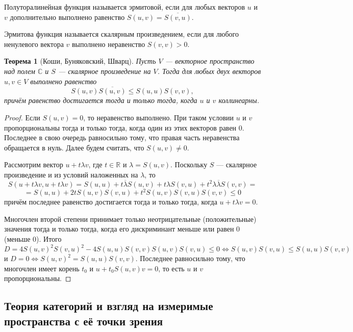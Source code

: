 \documentclass[12pt]{article}
\newtheorem{theorem}{Теорема}
\numberwithin{theorem}{section}
\numberwithin{proposition}{section}
\theoremstyle{definition}
\newcommand{\CC}{\mathbb{C}}
\newcommand{\RR}{\mathbb{R}}
\newcommand{\defin}[2]{\hypertarget{#2}{{\color{red} #1}}}
\begin{document}
	Полуторалинейная функция называется \defin{эрмитовой}{hermitian}, если для любых векторов $ u $ и $ v $ дополнительно выполнено равенство
	$ S(u, v) = \overline{S(v, u)} $.
	
	Эрмитова функция называется \defin{скалярным произведением}{C-inner-product}, если для любого ненулевого вектора $ v $
	выполнено неравенство $ S(v, v) > 0 $.
	
	
	\begin{theorem}[Коши, Буняковский, Шварц] \label{Cauchy-complex}
		Пусть $ V $ --- векторное пространство над полем $ \CC $ и $ S $ --- скалярное произведение на $ V $.
		Тогда для любых двух векторов $ u, v \in V $ выполнено равенство
		$$ S(u, v)\overline{S(u,v)} \leqslant S(u,u)S(v,v), $$
		причём равенство достигается тогда и только тогда, когда $ u $ и $ v $ коллинеарны.
	\end{theorem}
	
	\begin{proof}
		Если $ S(u, v) = 0 $, то неравенство выполнено. При таком условии $ u $ и $ v $ пропорциональны тогда и только тогда,
		когда один из этих векторов равен 0. Последнее в свою очередь равносильно тому, что правая часть неравенства обращается в нуль. Далее будем считать, что $ S(u,v) \neq 0 $.
		
		Рассмотрим вектор $ u + t\lambda v $, где $ t \in \RR $ и $ \lambda = S(u,v) $.
		Поскольку $ S $ --- скалярное произведение и из условий наложенных на $ 
		\lambda $, то 
		$$ S(u + t\lambda v, u + t\lambda v) 
		= S(u, u) + t\overline{\lambda}S(u, v) + t\lambda S(v, u) + t^2\lambda\overline{\lambda}S(v,v) = $$ 
		$$ = S(u,u) + 2tS(u,v)S(v,u) + t^2S(u,v)S(v,u)S(v,v) \leqslant 0 $$
		причём последнее равенство достигается тогда и только тогда, когда $ u + t\lambda v = 0 $.
		
		Многочлен второй степени принимает только неотрицательные (положительные) значения тогда и только тогда, когда его дискриминант меньше или равен 0 (меньше 0).
		Итого $$ D = 4S(u,v)^2S(v,u)^2 - 4S(u,u)S(v,v)S(u,v)S(v,u) \leqslant 0  \Leftrightarrow S(u,v)S(v,u) \leqslant S(u,u)S(v,v) $$
		и $ D = 0 \Leftrightarrow S(u,v)^2 = S(u,u)S(v,v) $. Последнее равносильно тому, что многочлен имеет корень $ t_0 $
		и $ u + t_0S(u, v)v = 0 $, то есть $ u $ и $ v $ пропорциональны.
	\end{proof}
	
	\subsection{Теория категорий и взгляд на измеримые пространства с её точки зрения}
	
\end{document}
